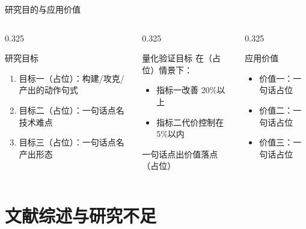 \documentclass[aspectratio=169,11pt]{beamer}
\begin{document}
\begin{frame}{研究目的与应用价值}
  \footnotesize
  \begin{columns}[T]
    \begin{column}{0.325\textwidth}
      \begin{dmucard}{研究目标}
        \begin{enumerate}
          \item 目标一（占位）：构建/攻克/产出的动作句式
          \item 目标二（占位）：一句话点名技术难点
          \item 目标三（占位）：一句话点名产出形态
        \end{enumerate}
      \end{dmucard}
    \end{column}
    \begin{column}{0.325\textwidth}
      \begin{dmucard}{量化验证目标}
        在（占位）情景下：
        \begin{itemize}
          \item 指标一改善 \textcolor{dmuaccent}{20\%以上}
          \item 指标二代价控制在 \textcolor{dmuaccent}{5\%以内}
        \end{itemize}
        \vskip0.6mm
        一句话点出价值落点（占位）
      \end{dmucard}
    \end{column}
    \begin{column}{0.325\textwidth}
      \begin{dmucard}{应用价值}
        \begin{itemize}
          \item \textcolor{dmuaccent}{价值一}：一句话占位
          \item \textcolor{dmuaccent}{价值二}：一句话占位
          \item \textcolor{dmuaccent}{价值三}：一句话占位
        \end{itemize}
      \end{dmucard}
    \end{column}
  \end{columns}
\end{frame}

\section{文献综述与研究不足}
\end{document}
